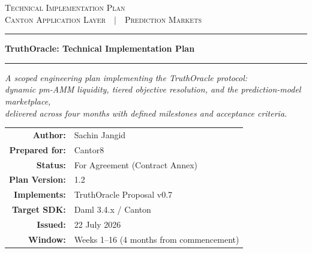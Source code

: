 \documentclass[11pt,a4paper]{article}
\begin{document}
\thispagestyle{empty}
\vspace*{2cm}

\begin{center}
{\scshape Technical Implementation Plan}\\[3pt]
{\footnotesize\scshape Canton Application Layer\ \ $\vert$\ \ Prediction Markets}
\end{center}

\vspace{1.5cm}
\noindent\rule{\linewidth}{0.4pt}

\vspace{0.5cm}
\begin{center}
{\Large\bfseries TruthOracle: Technical Implementation Plan\par}
\end{center}

\vspace{0.4cm}
\noindent\rule{\linewidth}{0.4pt}

\vspace{1.5cm}
\begin{center}
\itshape
A scoped engineering plan implementing the TruthOracle protocol:\\
dynamic pm-AMM liquidity, tiered objective resolution, and the prediction-model marketplace,\\
delivered across four months with defined milestones and acceptance criteria.
\end{center}

\vspace{2cm}
\begin{center}
\begin{tabular}{r l}
\textbf{Author:} & Sachin Jangid \\[6pt]
\textbf{Prepared for:} & Cantor8 \\
\textbf{Status:}  & For Agreement (Contract Annex) \\
\textbf{Plan Version:} & 1.2 \\
\textbf{Implements:} & TruthOracle Proposal v0.7 \\
\textbf{Target SDK:} & Daml 3.4.x / Canton \\[6pt]
\textbf{Issued:} & 22 July 2026 \\
\textbf{Window:} & Weeks 1--16 (4 months from commencement) \\
\end{tabular}
\end{center}
\vfill

\newpage
\end{document}
